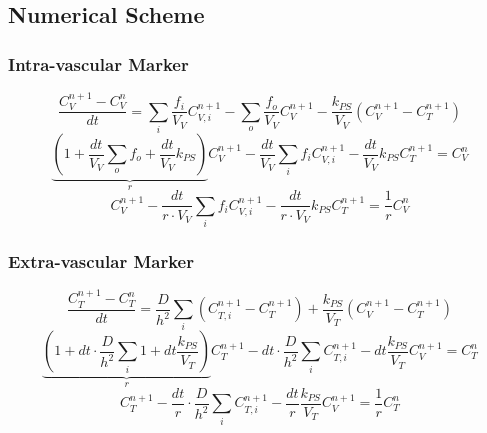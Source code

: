 \documentclass{article}
\begin{document}
\subsection{Numerical Scheme}
\subsubsection{Intra-vascular Marker}
\begin{equation}
	\frac{C_V^{n+1}-C_V^n}{dt} =  \sum_i \frac{f_i}{V_V} C_{V,i}^{n+1} - \sum_o \frac{f_o}{V_V}C_{V}^{n+1} - \frac{k_{PS}}{V_V}(C_V^{n+1} - C_T^{n+1})
\end{equation}
\begin{equation}
	\underbrace{\left(1 + \frac{dt}{V_V}\sum_o f_o + \frac{dt}{V_V} k_{PS}\right)}_{r}  C_V^{n+1} - \frac{dt}{V_V} \sum_i f_i C_{V,i}^{n+1} - \frac{dt}{V_V} k_{PS} C_T^{n+1} = C_V^n
\end{equation}
\begin{equation}
	C_V^{n+1} - \frac{dt}{r\cdot V_V} \sum_i f_i C_{V,i}^{n+1} - \frac{dt}{r\cdot V_V} k_{PS} C_T^{n+1} = \frac{1}{r}C_V^n
\end{equation}

\subsubsection{Extra-vascular Marker}
\begin{equation}
	\frac{C_T^{n+1} - C_T^{n}}{dt} = \frac{D}{h^2} \sum_i \left(C_{T,i}^{n+1} - C_{T}^{n+1} \right) + \frac{k_{PS}}{V_T}(C_V^{n+1} - C_T^{n+1})
\end{equation}
\begin{equation}
	\underbrace{\left(1 + dt \cdot \frac{D}{h^2} \sum_i 1 + dt\frac{k_{PS}}{V_T}\right)}_{r} C_T^{n+1} - dt \cdot \frac{D}{h^2} \sum_i C_{T,i}^{n+1} - dt\frac{k_{PS}}{V_T}C_V^{n+1} = C_T^{n}
\end{equation}
\begin{equation}
	C_T^{n+1} - \frac{dt}{r} \cdot \frac{D}{h^2} \sum_i C_{T,i}^{n+1} - \frac{dt}{r}\frac{k_{PS}}{V_T}C_V^{n+1} = \frac{1}{r}C_T^{n}
\end{equation}
\end{document}
